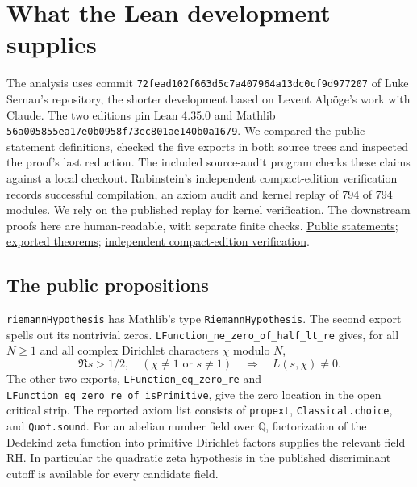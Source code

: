 \documentclass[11pt,letterpaper]{article}
\newcommand{\repo}[2]{\href{https://github.com/lsernau/grh-lean/blob/72fead102f663d5c7a407964a13dc0cf9d977207/grh/#1}{#2}}
\begin{document}
\section{What the Lean development supplies}
The analysis uses commit \texttt{72fead102f663d5c7a407964a13dc0cf9d977207} of Luke Sernau's repository, the shorter development based on Levent Alp\"oge's work with Claude. The two editions pin Lean 4.35.0 and Mathlib \texttt{56a005855ea17e0b0958f73ec801ae140b0a1679}. We compared the public statement definitions, checked the five exports in both source trees and inspected the proof's last reduction. The included source-audit program checks these claims against a local checkout. Rubinstein's independent compact-edition verification records successful compilation, an axiom audit and kernel replay of 794 of 794 modules. We rely on the published replay for kernel verification. The downstream proofs here are human-readable, with separate finite checks.
\repo{src/Statements.lean}{Public statements};
\repo{src/Main.lean}{exported theorems};
\href{https://mrubinst.github.io/grh-lean-compact-check/}{independent compact-edition verification}.

\subsection*{The public propositions}
\texttt{riemannHypothesis} has Mathlib's type \texttt{RiemannHypothesis}. The second export spells out its nontrivial zeros.
\texttt{LFunction\_ne\_zero\_of\_half\_lt\_re} gives, for all $N\ge1$ and all complex Dirichlet characters $\chi$ modulo $N$,
\[
  \Re s>1/2,\quad (\chi\ne1\text{ or }s\ne1)\quad\Longrightarrow\quad L(s,\chi)\ne0.
\]
The other two exports, \texttt{LFunction\_eq\_zero\_re} and \texttt{LFunction\_eq\_zero\_re\_of\_isPrimitive}, give the zero location in the open critical strip. The reported axiom list consists of \texttt{propext}, \texttt{Classical.choice}, and \texttt{Quot.sound}. For an abelian number field over $\mathbb Q$, factorization of the Dedekind zeta function into primitive Dirichlet factors supplies the relevant field RH. In particular the quadratic zeta hypothesis in the published discriminant cutoff is available for every candidate field.
\end{document}
